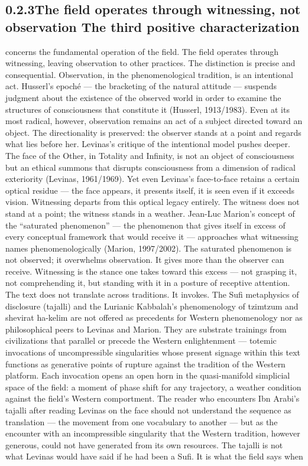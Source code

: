 \subsection{0.2.3\quad The field operates through witnessing, not observation The third positive characterization}

concerns the fundamental operation of the field. The field operates through witnessing, leaving observation to other practices. The distinction is precise and consequential. Observation, in the phenomenological tradition, is an intentional act. Husserl’s epoché — the bracketing of the natural attitude — suspends judgment about the existence of the observed world in order to examine the structures of consciousness that constitute it (Husserl, 1913/1983). Even at its most radical, however, observation remains an act of a subject directed toward an object. The directionality is preserved: the observer stands at a point and regards what lies before her. Levinas’s critique of the intentional model pushes deeper. The face of the Other, in Totality and Infinity, is not an object of consciousness but an ethical summons that disrupts consciousness from a dimension of radical exteriority (Levinas, 1961/1969). Yet even Levinas’s face-to-face retains a certain optical residue — the face appears, it presents itself, it is seen even if it exceeds vision. Witnessing departs from this optical legacy entirely. The witness does not stand at a point; the witness stands in a weather. Jean-Luc Marion’s concept of the “saturated phenomenon” — the phenomenon that gives itself in excess of every conceptual framework that would receive it — approaches what witnessing names phenomenologically (Marion, 1997/2002). The saturated phenomenon is not observed; it overwhelms observation. It gives more than the observer can receive. Witnessing is the stance one takes toward this excess — not grasping it, not comprehending it, but standing with it in a posture of receptive attention. The text does not translate across traditions. It invokes. The Sufi metaphysics of disclosure (tajalli) and the Lurianic Kabbalah’s phenomenology of tzimtzum and shevirat ha-kelim are not offered as precedents for Western phenomenology nor as philosophical peers to Levinas and Marion. They are substrate trainings from civilizations that parallel or precede the Western enlightenment — totemic invocations of uncompressible singularities whose present signage within this text functions as generative points of rupture against the tradition of the Western platform. Each invocation opens an open horn in the quasi-manifold simplicial space of the field: a moment of phase shift for any trajectory, a weather condition against the field’s Western comportment. The reader who encounters Ibn Arabi’s tajalli after reading Levinas on the face should not understand the sequence as translation — the movement from one vocabulary to another — but as the encounter with an incompressible singularity that the Western tradition, however generous, could not have generated from its own resources. The tajalli is not what Levinas would have said if he had been a Sufi. It is what the field says when

